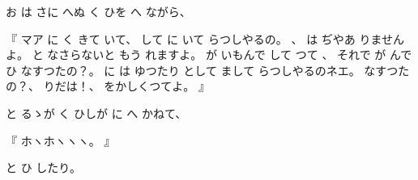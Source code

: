
%
お
は
さに%
へぬ
く
ひを
へ
ながら、

%
『
マア
に
く
きて
いて、
%
して
に
いて
らつしやるの。
%
、
%
は
ぢやあ
りませんよ。
%
と
なさらないと
もう
れますよ。
%
が
いもんで
して
つて
、
%
%
それで
が
んで
ひ
なすつたの？。
%
に
は
ゆつたり
として
まして
らつしやるのネエ。
%
なすつたの？、
%
りだは！、
%
をかしくつてよ。
』

%
と
るゝが
く
ひしが
に
へ
かねて、

%
『
ホヽホヽヽヽ。
』

%
と
ひ
したり。


